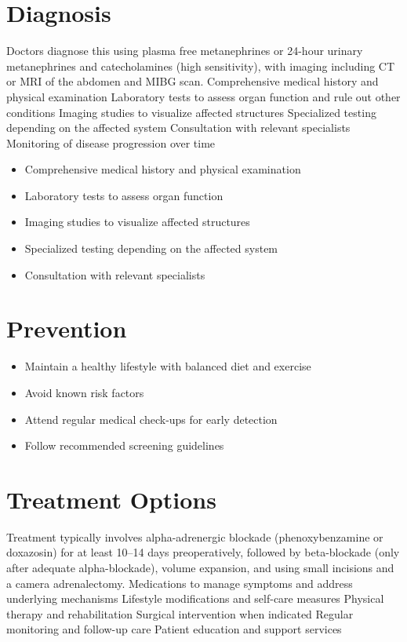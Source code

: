 \section{Diagnosis}
Doctors diagnose this using plasma free metanephrines or 24-hour urinary metanephrines and catecholamines (high sensitivity), with imaging including CT or MRI of the abdomen and MIBG scan. Comprehensive medical history and physical examination Laboratory tests to assess organ function and rule out other conditions Imaging studies to visualize affected structures Specialized testing depending on the affected system Consultation with relevant specialists Monitoring of disease progression over time

\begin{itemize}[noitemsep]
  \item Comprehensive medical history and physical examination
  \item Laboratory tests to assess organ function
  \item Imaging studies to visualize affected structures
  \item Specialized testing depending on the affected system
  \item Consultation with relevant specialists
\end{itemize}
\section{Prevention}
\begin{itemize}[noitemsep]
  \item Maintain a healthy lifestyle with balanced diet and exercise
  \item Avoid known risk factors
  \item Attend regular medical check-ups for early detection
  \item Follow recommended screening guidelines
\end{itemize}
\section{Treatment Options}
Treatment typically involves alpha-adrenergic blockade (phenoxybenzamine or doxazosin) for at least 10--14 days preoperatively, followed by beta-blockade (only after adequate alpha-blockade), volume expansion, and using small incisions and a camera adrenalectomy. Medications to manage symptoms and address underlying mechanisms Lifestyle modifications and self-care measures Physical therapy and rehabilitation Surgical intervention when indicated Regular monitoring and follow-up care Patient education and support services

